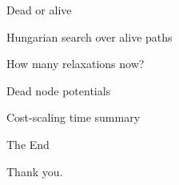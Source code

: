 \documentclass[xcolor={dvipsnames,usenames}]{beamer}
\newcommand{\eps}{\varepsilon}
\begin{document}
\begin{frame}{Dead or alive}
\end{frame}

\begin{frame}{Hungarian search over alive paths}
\end{frame}

\begin{frame}{How many relaxations now?}
\end{frame}

\begin{frame}{Dead node potentials}
\end{frame}

\begin{frame}{Cost-scaling time summary}
\end{frame}


\begin{frame}{The End}
\begin{center}
	Thank you.
\end{center}
\end{frame}







%
%
\end{document}
